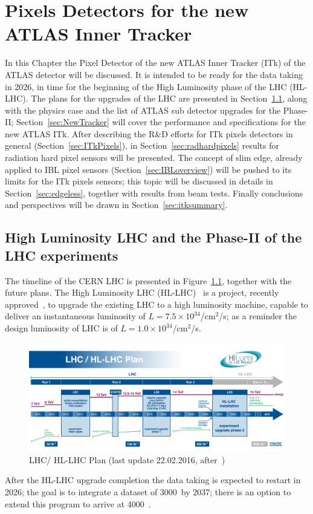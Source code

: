 \chapter{Pixels Detectors for the new ATLAS Inner Tracker}
\label{chap:ITk}

In this Chapter the Pixel Detector of the new ATLAS Inner Tracker (ITk) of the ATLAS detector will be discussed. It is intended to be ready 
for  the data taking in 2026, in time for the beginning of the High Luminosity phase of the LHC (HL-LHC). 
The plans for the upgrades of the LHC are presented in Section~\ref{sec:HL-LHC}, along with the 
physics case and the list of ATLAS sub detector upgrades for the Phase-II; 
Section~\ref{sec:NewTracker} will cover the performance and specifications for the new ATLAS ITk. 
After describing the R\&D efforts for ITk pixels detectors in general (Section~\ref{sec:ITkPixels}), 
in Section~\ref{sec:radhardpixels} results for radiation hard pixel sensors will be presented. 
The concept of slim edge, already applied to IBL pixel sensors (Section~\ref{sec:IBLoverview}) will be 
pushed to its limits for the ITk pixels sensors; this topic will be discussed in details in 
Section~\ref{sec:edgeless}, together with results from beam tests. 
Finally conclusions and perspectives will be drawn in Section~\ref{sec:itksummary}.



\section{High Luminosity LHC and the Phase-II of the LHC experiments}
\label{sec:HL-LHC}

The timeline of the CERN LHC is presented in Figure~\ref{fig:HL-LHC-plan-2016-01}, together 
with the future plans. The High Luminosity LHC (HL-LHC)~\cite{HL_LHC} is a project, recently 
approved~\cite{HL-LHCApproval},  to upgrade the existing LHC to a high luminosity machine, 
capable to deliver an instantaneous luminosity of $L=7.5\times10^{34}$/cm$^{2}$/s; as a 
reminder the design luminosity of LHC is of $L=1.0\times10^{34}$/cm$^{2}$/s.
\begin{figure}[!htpb]
\centering
\includegraphics[width=1.0\textwidth]{HL-LHC-plan-2016-01.png}
\caption{\label{fig:HL-LHC-plan-2016-01}LHC/ HL-LHC Plan (last update 22.02.2016, after~\cite{HL_LHC})}
\end{figure}
After the HL-LHC upgrade completion the data taking  is expected to restart in 2026; the goal 
is to integrate a dataset of 3000~\invfb by 2037; there is an option to extend this program to arrive 
at 4000~\invfb.

